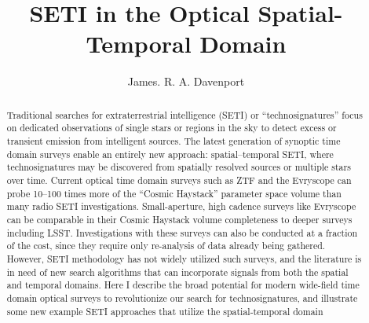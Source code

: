 \documentclass[twocolumn]{aastex62}
\begin{document}
\title{SETI in the Optical Spatial-Temporal Domain}



\author{James. R. A. Davenport}


\begin{abstract}
Traditional searches for extraterrestrial intelligence (SETI) or ``technosignatures'' focus on dedicated observations of single stars or regions in the sky to detect excess or transient emission from intelligent sources. The latest generation of synoptic time domain surveys  enable an entirely new approach: spatial--temporal SETI, where technosignatures may be discovered from spatially resolved sources or multiple stars over time. 
Current optical time domain surveys such as ZTF and the Evryscope can probe 10--100 times more of the ``Cosmic Haystack'' parameter space volume than many radio SETI investigations. Small-aperture, high cadence surveys like Evryscope can be comparable in their Cosmic Haystack volume completeness to deeper surveys including LSST. Investigations with these surveys can also be conducted at a fraction of the cost, since they require only re-analysis of data already being gathered. 
However, SETI methodology has not widely utilized such surveys, and the literature is in need of new search algorithms that can incorporate signals from both the spatial and temporal domains.
Here I describe the broad potential for modern wide-field time domain optical surveys to revolutionize our search for technosignatures, and illustrate some new example SETI approaches that utilize the spatial-temporal domain
\end{abstract}

\end{document}
